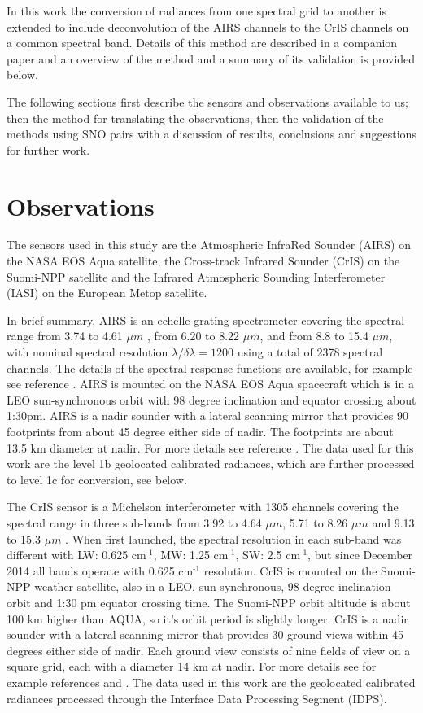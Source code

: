 \documentclass[11pt]{article}
\begin{document}
In this work the conversion of radiances from one spectral grid to another is extended to include deconvolution of the AIRS channels to the CrIS channels on a common spectral band. Details of this method are described in a companion paper \cite{Motteler2017a} and an overview of the method and a summary of its validation is provided below. 

The following sections first describe the sensors and observations available to us; then the method for translating the observations, then the validation of the methods using SNO pairs with a discussion of results, conclusions and suggestions for further work.

\section{Observations}
\label{sec:orgheadline3}

The sensors used in this study are the Atmospheric InfraRed Sounder (AIRS) on the NASA EOS Aqua satellite, the Cross-track Infrared Sounder (CrIS) on the Suomi-NPP satellite and the Infrared Atmospheric Sounding Interferometer (IASI) on the European Metop satellite.

In brief summary, AIRS is an echelle grating spectrometer covering the spectral range from 3.74 to 4.61 \(\mu m\) , from 6.20 to 8.22 \(\mu m\), and from 8.8 to 15.4 \(\mu m\), with nominal spectral resolution \(\lambda/\delta\lambda= 1200\) using a total of 2378 spectral channels. The details of the spectral response functions are available, for example see reference \cite{airscalib}. AIRS is mounted on the NASA EOS Aqua spacecraft which is in a LEO sun-synchronous orbit with 98 degree inclination and equator crossing about 1:30pm. AIRS is a nadir sounder with a lateral scanning mirror that provides 90 footprints from about 45 degree either side of nadir. The footprints are about 13.5 km diameter at nadir. For more details see reference \cite{airseos}. The data used for this work are the level 1b geolocated calibrated radiances, which are further processed to level 1c for conversion, see below.

The CrIS sensor is a Michelson interferometer with 1305 channels covering the spectral range in three sub-bands from 3.92 to 4.64 \(\mu m\), 5.71 to 8.26 \(\mu m\) and 9.13 to 15.3 \(\mu m\) . When first launched, the spectral resolution in each sub-band was different with LW: 0.625 cm\(^{\text{-1}}\), MW: 1.25 cm\(^{\text{-1}}\), SW: 2.5 cm\(^{\text{-1}}\), but since December 2014 all bands operate with 0.625 cm\(^{\text{-1}}\) resolution. CrIS is mounted on the Suomi-NPP weather satellite, also in a LEO, sun-synchronous, 98-degree inclination orbit and 1:30 pm equator crossing time. The Suomi-NPP orbit altitude is about 100 km higher than AQUA, so it's orbit period is slightly longer. CrIS is a nadir sounder with a lateral scanning mirror that provides 30 ground views within 45 degrees either side of nadir. Each ground view consists of nine fields of view on a square grid, each with a diameter 14 km at nadir. For more details see for example references \cite{crisweb} and \cite{criscal}. The data used in this work are the geolocated calibrated radiances processed through the Interface Data Processing Segment (IDPS).
\end{document}

